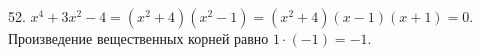 52. $x^4+3x^2-4=(x^2+4)(x^2-1)=(x^2+4)(x-1)(x+1)=0.$ Произведение вещественных корней равно $1\cdot(-1)=-1.$\\
